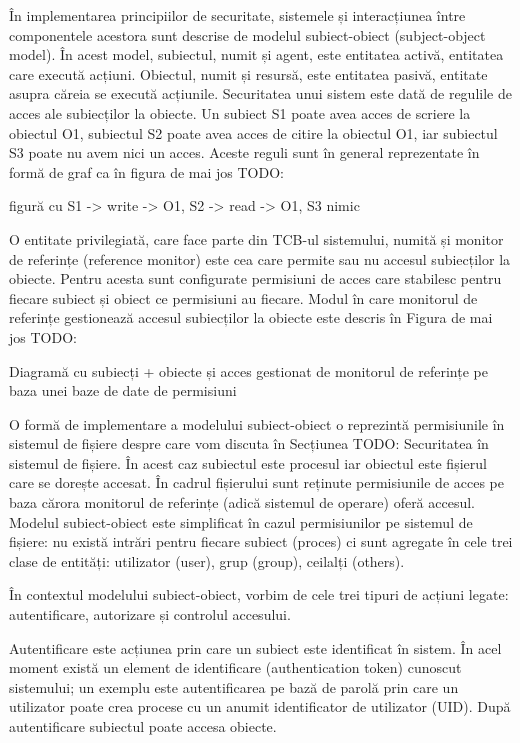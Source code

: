 În implementarea principiilor de securitate, sistemele și interacțiunea între componentele acestora sunt descrise de modelul subiect-obiect (subject-object model). În acest model, subiectul, numit și agent, este entitatea activă, entitatea care execută acțiuni. Obiectul, numit și resursă, este entitatea pasivă, entitate asupra căreia se execută acțiunile. Securitatea unui sistem este dată de regulile de acces ale subiecților la obiecte. Un subiect S1 poate avea acces de scriere la obiectul O1, subiectul S2 poate avea acces de citire la obiectul O1, iar subiectul S3 poate nu avem nici un acces. Aceste reguli sunt în general reprezentate în formă de graf ca în figura de mai jos TODO:

figură cu S1 -> write -> O1, S2 -> read -> O1, S3 nimic

O entitate privilegiată, care face parte din TCB-ul sistemului, numită și monitor de referințe (reference monitor) este cea care permite sau nu accesul subiecților la obiecte. Pentru acesta sunt configurate permisiuni de acces care stabilesc pentru fiecare subiect și obiect ce permisiuni au fiecare. Modul în care monitorul de referințe gestionează accesul subiecților la obiecte este descris în Figura de mai jos TODO:

Diagramă cu subiecți + obiecte și acces gestionat de monitorul de referințe pe baza unei baze de date de permisiuni

O formă de implementare a modelului subiect-obiect o reprezintă permisiunile în sistemul de fișiere despre care vom discuta în Secțiunea TODO: Securitatea în sistemul de fișiere. În acest caz subiectul este procesul iar obiectul este fișierul care se dorește accesat. În cadrul fișierului sunt reținute permisiunile de acces pe baza cărora monitorul de referințe (adică sistemul de operare) oferă accesul. Modelul subiect-obiect este simplificat în cazul permisiunilor pe sistemul de fișiere: nu există intrări pentru fiecare subiect (proces) ci sunt agregate în cele trei clase de entități: utilizator (user), grup (group), ceilalți (others).

În contextul modelului subiect-obiect, vorbim de cele trei tipuri de acțiuni legate: autentificare, autorizare și controlul accesului.

Autentificare este acțiunea prin care un subiect este identificat în sistem. În acel moment există un element de identificare (authentication token) cunoscut sistemului; un exemplu este autentificarea pe bază de parolă prin care un utilizator poate crea procese cu un anumit identificator de utilizator (UID). După autentificare subiectul poate accesa obiecte.

